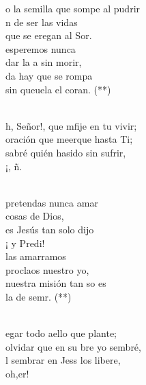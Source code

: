 \begin{cancion}%
	o la semilla que sompe al pudrir\\
	n de ser las vidas \\
	que se eregan al Sor.\\
	esperemos nunca \\
	dar la a sin morir,\\
	da hay que se rompa \\
	sin queuela el coran. (**)\\\jump\\
	\begin{chorus}%
	h, Señor!, que mfije en tu vivir;\\
	 oración que meerque hasta Ti;\\
	sabré quién hasido sin sufrir, \\
	¡, ñ. \\
	\end{chorus}%
	\jump\\
	pretendas nunca amar \\
cosas de Dios,\\
	es Jesús tan solo dijo\\
	¡ y Predi! \\
	las amarramos \\
	proclaos nuestro yo,\\
	nuestra misión tan so es \\
	la de semr. (**)\\\jump\\
	\begin{chorus}%
	egar todo aello que plante;\\
	 olvidar que en su bre yo sembré,\\
	l sembrar en Jess los libere, \\
	oh,er!\\
	\end{chorus}%
	\jump\\
\end{cancion}%
